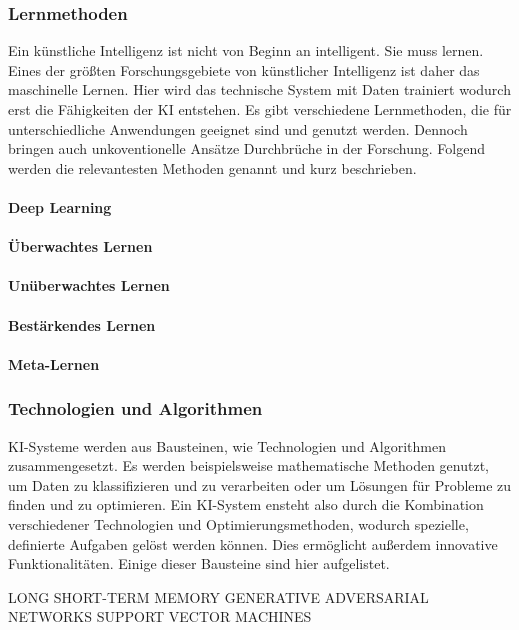 \documentclass[a4paper,12pt, german]{report}
\begin{document}
\subsubsection{Lernmethoden}
Ein künstliche Intelligenz ist nicht von Beginn an intelligent. Sie muss lernen. Eines der größten Forschungsgebiete von künstlicher Intelligenz ist daher das maschinelle Lernen. Hier wird das technische System mit Daten trainiert wodurch erst die Fähigkeiten der KI entstehen. Es gibt verschiedene Lernmethoden, die für unterschiedliche Anwendungen geeignet sind und genutzt werden. Dennoch bringen auch unkoventionelle Ansätze Durchbrüche in der Forschung. Folgend werden die relevantesten Methoden genannt und kurz beschrieben.

\paragraph{Deep Learning}
\paragraph{Überwachtes Lernen}
\paragraph{Unüberwachtes Lernen}
\paragraph{Bestärkendes Lernen}
\paragraph{Meta-Lernen}


\subsubsection{Technologien und Algorithmen}
KI-Systeme werden aus Bausteinen, wie Technologien und Algorithmen zusammengesetzt. Es werden beispielsweise mathematische Methoden genutzt, um Daten zu klassifizieren und zu verarbeiten oder um Lösungen für Probleme zu finden und zu optimieren. Ein KI-System ensteht also durch die Kombination verschiedener Technologien und Optimierungsmethoden, wodurch spezielle, definierte Aufgaben gelöst werden können. Dies ermöglicht außerdem innovative Funktionalitäten. Einige dieser Bausteine sind hier aufgelistet.

LONG SHORT-TERM MEMORY
GENERATIVE ADVERSARIAL NETWORKS
SUPPORT VECTOR MACHINES
\end{document}
